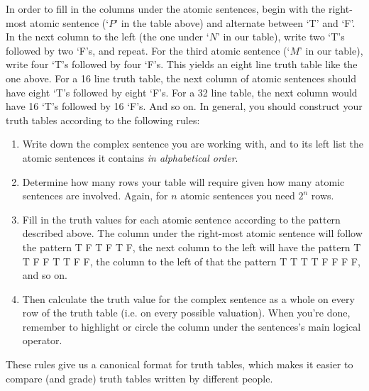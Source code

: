 

In order to fill in the columns under the atomic sentences, begin with the right-most atomic sentence (`$P$' in the table above) and alternate between `T' and `F'. In the next column to the left (the one under `$N$' in our table), write two `T's followed by two `F's, and repeat. For the third atomic sentence (`$M$' in our table), write four `T's followed by four `F's. This yields an eight line truth table like the one above. For a 16 line truth table, the next column of atomic sentences should have eight `T's followed by eight `F's. For a 32 line table, the next column would have 16 `T's followed by 16 `F's. And so on.  In general, you should construct your truth tables according to the following rules:
\begin{enumerate}
\item Write down the complex sentence you are working with, and to its left list the atomic sentences it contains \emph{in alphabetical order}.
\item Determine how many rows your table will require given how many atomic sentences are involved.  Again, for $n$ atomic sentences you need $2^n$ rows.
\item Fill in the truth values for each atomic sentence according to the pattern described above.  The column under the right-most atomic sentence will follow the pattern T F T F T F, the next column to the left will have the pattern T T F F T T F F, the column to the left of that the pattern T T T T F F F F, and so on.
\item Then calculate the truth value for the complex sentence as a whole on every row of the truth table (i.e. on every possible valuation).  When you're done, remember to highlight or circle the column under the sentences's main logical operator.
\end{enumerate}
These rules give us a canonical format for truth tables, which makes it easier to compare (and grade) truth tables written by different people.

